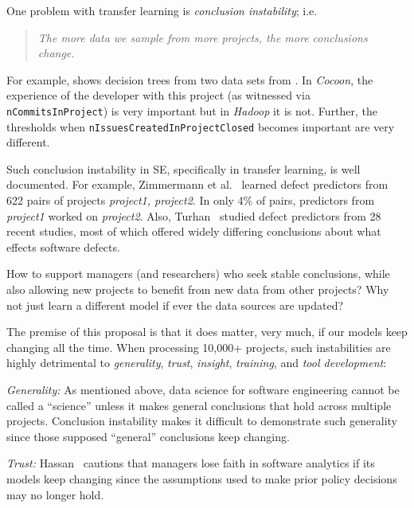  


 One 
problem with transfer learning is  {\em conclusion instability}; i.e.  
\begin{quote}
{\em The more
data we sample from more projects, the more   conclusions change.}
\end{quote}
For example,  shows decision trees from two data sets from . In {\em Cocoon},
the experience of the developer with this
project (as witnessed via {\tt nCommitsInProject})
is very important but in {\em Hadoop} it is not.
Further, the thresholds when {\tt nIssuesCreatedInProjectClosed} becomes important
are very different.

 
Such conclusion instability in SE, specifically in transfer 
learning, is well documented.
For example, 
Zimmermann
et al.~\cite{zimm09} learned defect predictors from 622 pairs
of projects {\em project1, project2}. In only 4\% of pairs,
   predictors from {\em project1} worked on
{\em project2}. 
Also, Turhan~\cite{me12d} studied defect predictors  from 28 recent  
studies, most of which offered widely differing conclusions about what  
effects software defects.  

How to support  managers (and researchers) who seek stable conclusions,
while also allowing new projects
to   benefit from new data from other projects?
 Why not just learn a  different model if ever the data sources  
are updated? 


The premise of this proposal is that it does matter,
very much, if our models keep changing all the time.
When processing  10,000+ projects, such   instabilities are  highly detrimental to   {\em generality}, {\em trust}, {\em insight},  {\em training}, and {\em tool development}:
\bi
\item {\em Generality:} As mentioned above,  data science for software engineering cannot be called a ``science'' unless it makes general conclusions that hold across  multiple  projects. Conclusion instability makes it difficult to demonstrate such generality
since those supposed ``general'' conclusions keep changing.
\item {\em Trust:}
 Hassan~\cite{Hassan17} cautions that 
managers lose faith
 in software analytics if its models keep changing
 since  the assumptions used to 
make prior policy decisions may no longer hold.

